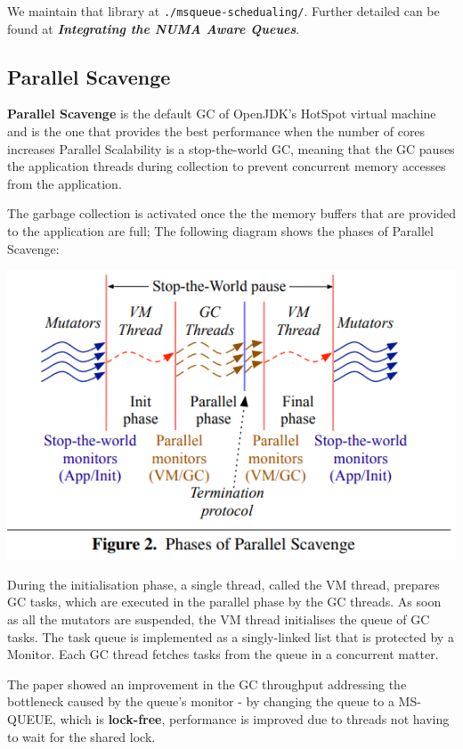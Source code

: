 \documentclass{article}
\begin{document}
 We maintain that library at \texttt{./msqueue-schedualing/}. Further detailed can be found at \textbf{\textit{Integrating the NUMA Aware Queues}}.

 \newpage

 \subsection{Parallel Scavenge}
 \textbf{Parallel Scavenge} is the default GC of OpenJDK’s HotSpot virtual machine and is the one that provides the best performance when the number of cores increases\cite{paper}
 Parallel Scalability is a stop-the-world GC, meaning that the GC pauses the application threads during collection to prevent concurrent memory accesses from the application.

 The garbage collection is activated once the the memory buffers that are provided to the application are full; The following diagram shows the phases of Parallel Scavenge:

 \includegraphics[width=\textwidth]{gc_phases.png}

 During the initialisation phase, a single thread, called the VM thread, prepares GC tasks, which are executed in the parallel phase by the GC threads.
 As soon as all the mutators are suspended, the VM thread initialises the queue of GC tasks. The task queue is implemented as a singly-linked list that is protected by a Monitor.
 Each GC thread fetches tasks from the queue in a concurrent matter. 
 
 The paper showed an improvement in the GC throughput addressing the bottleneck caused by the queue's monitor - by changing the queue to a MS-QUEUE, which is \textbf{lock-free}, performance is improved due to threads not having to wait for the shared lock.
\end{document}
